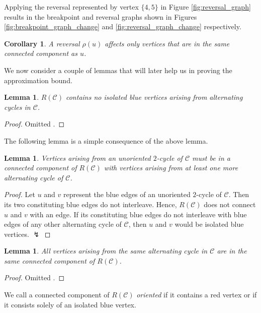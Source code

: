 \documentclass[11pt,DIV=11]{scrartcl}
\def\padding{\vspace{2em}}
\newtheorem{corollary}{Corollary}[theorem]
\newtheorem{lemma}[theorem]{Lemma}
\theoremstyle{definition}
\theoremstyle{remark}
\begin{document}
Applying the reversal represented by vertex $\{4,5\}$ in Figure \ref{fig:reversal_graph} results in the breakpoint and reversal graphs shown in Figures \ref{fig:breakpoint_graph_change} and \ref{fig:reversal_graph_change} respectively.

\begin{corollary}
A reversal $\rho(u)$ affects only vertices that are in the same connected component as $u$.
\end{corollary}\padding

We now consider a couple of lemmas that will later help us in proving the approximation bound.

\begin{lemma}
\label{lem:4}
$R(\mathcal{C})$ contains no isolated blue vertices arising from alternating cycles in $\mathcal{C}$.
\end{lemma}

\begin{proof}
Omitted \cite{Christie1998}.
\end{proof}

The following lemma is a simple consequence of the above lemma.

\begin{lemma}
\label{lem:5}
Vertices arising from an unoriented $2$-cycle of $\mathcal{C}$ must be in a connected component of $R(\mathcal{C})$ with vertices arising from at least one more alternating cycle of $\mathcal{C}$.
\end{lemma}

\begin{proof}
Let $u$ and $v$ represent the blue edges of an unoriented $2$-cycle of $\mathcal{C}$. Then its two constituting blue edges do not interleave. Hence, $R(\mathcal{C})$ does not connect $u$ and $v$ with an edge. If its constituting blue edges do not interleave with blue edges of any other alternating cycle of $\mathcal{C}$, then $u$ and $v$ would be isolated blue vertices. $\lightning$
\end{proof}

\begin{lemma}
\label{lem:6}
All vertices arising from the same alternating cycle in $\mathcal{C}$ are in the same connected component of $R(\mathcal{C})$.
\end{lemma}

\begin{proof}
Omitted \cite{Christie1998}.
\end{proof}\padding

We call a connected component of $R(\mathcal{C})$ \textit{oriented} if it contains a red vertex or if it consists solely of an isolated blue vertex.
\end{document}
